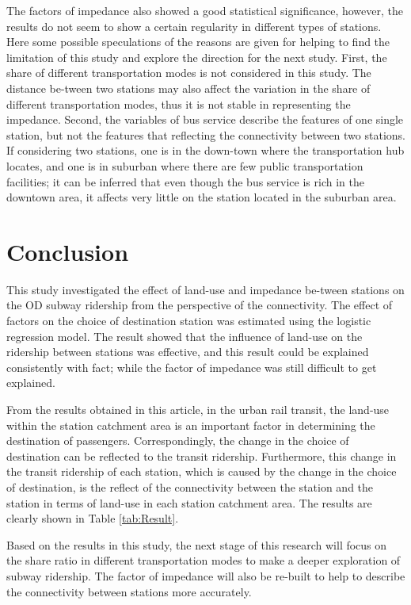 \documentclass[utf8]{article}
\begin{document}
%
The factors of impedance also showed a good statistical significance, however, the results do not seem to show a certain regularity in different types of stations. Here some possible speculations of the reasons are given for helping to find the limitation of this study and explore the direction for the next study. First, the share of different transportation modes is not considered in this study. The distance be-tween two stations may also affect the variation in the share of different transportation modes, thus it is not stable in representing the impedance.  Second, the variables of bus service describe the features of one single station, but not the features that reflecting the connectivity between two stations. If considering two stations, one is in the down-town where the transportation hub locates, and one is in suburban where there are few public transportation facilities; it can be inferred that even though the bus service is rich in the downtown area, it affects very little on the station located in the suburban area.

\section{Conclusion}
\indent

%
This study investigated the effect of land-use and impedance be-tween stations on the OD subway ridership from the perspective of the connectivity. The effect of factors on the choice of destination station was estimated using the logistic regression model. The result showed that the influence of land-use on the ridership between stations was effective, and this result could be explained consistently with fact; while the factor of impedance was still difficult to get explained.

%
From the results obtained in this article, in the urban rail transit, the land-use within the station catchment area is an important factor in determining the destination of passengers. Correspondingly, the change in the choice of destination can be reflected to the transit ridership. Furthermore, this change in the transit ridership of each station, which is caused by the change in the choice of destination, is the reflect of the connectivity between the station and the station in terms of land-use in each station catchment area. The results are clearly shown in Table \ref{tab:Result}.

%
Based on the results in this study, the next stage of this research will focus on the share ratio in different transportation modes to make a deeper exploration of subway ridership. The factor of impedance will also be re-built to help to describe the connectivity between stations more accurately.



\clearpage


\end{document}
